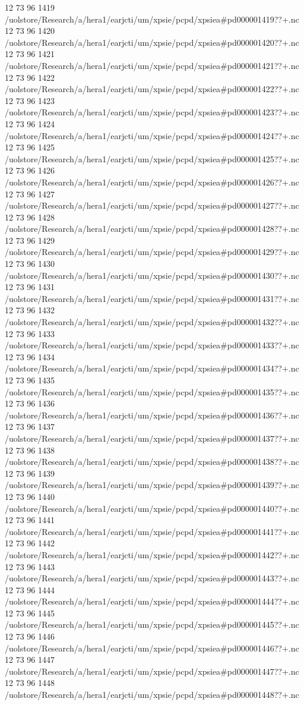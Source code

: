 12 73 96
1419
/uolstore/Research/a/hera1/earjcti/um/xpsie/pcpd/xpsiea#pd000001419??+.nc
12 73 96
1420
/uolstore/Research/a/hera1/earjcti/um/xpsie/pcpd/xpsiea#pd000001420??+.nc
12 73 96
1421
/uolstore/Research/a/hera1/earjcti/um/xpsie/pcpd/xpsiea#pd000001421??+.nc
12 73 96
1422
/uolstore/Research/a/hera1/earjcti/um/xpsie/pcpd/xpsiea#pd000001422??+.nc
12 73 96
1423
/uolstore/Research/a/hera1/earjcti/um/xpsie/pcpd/xpsiea#pd000001423??+.nc
12 73 96
1424
/uolstore/Research/a/hera1/earjcti/um/xpsie/pcpd/xpsiea#pd000001424??+.nc
12 73 96
1425
/uolstore/Research/a/hera1/earjcti/um/xpsie/pcpd/xpsiea#pd000001425??+.nc
12 73 96
1426
/uolstore/Research/a/hera1/earjcti/um/xpsie/pcpd/xpsiea#pd000001426??+.nc
12 73 96
1427
/uolstore/Research/a/hera1/earjcti/um/xpsie/pcpd/xpsiea#pd000001427??+.nc
12 73 96
1428
/uolstore/Research/a/hera1/earjcti/um/xpsie/pcpd/xpsiea#pd000001428??+.nc
12 73 96
1429
/uolstore/Research/a/hera1/earjcti/um/xpsie/pcpd/xpsiea#pd000001429??+.nc
12 73 96
1430
/uolstore/Research/a/hera1/earjcti/um/xpsie/pcpd/xpsiea#pd000001430??+.nc
12 73 96
1431
/uolstore/Research/a/hera1/earjcti/um/xpsie/pcpd/xpsiea#pd000001431??+.nc
12 73 96
1432
/uolstore/Research/a/hera1/earjcti/um/xpsie/pcpd/xpsiea#pd000001432??+.nc
12 73 96
1433
/uolstore/Research/a/hera1/earjcti/um/xpsie/pcpd/xpsiea#pd000001433??+.nc
12 73 96
1434
/uolstore/Research/a/hera1/earjcti/um/xpsie/pcpd/xpsiea#pd000001434??+.nc
12 73 96
1435
/uolstore/Research/a/hera1/earjcti/um/xpsie/pcpd/xpsiea#pd000001435??+.nc
12 73 96
1436
/uolstore/Research/a/hera1/earjcti/um/xpsie/pcpd/xpsiea#pd000001436??+.nc
12 73 96
1437
/uolstore/Research/a/hera1/earjcti/um/xpsie/pcpd/xpsiea#pd000001437??+.nc
12 73 96
1438
/uolstore/Research/a/hera1/earjcti/um/xpsie/pcpd/xpsiea#pd000001438??+.nc
12 73 96
1439
/uolstore/Research/a/hera1/earjcti/um/xpsie/pcpd/xpsiea#pd000001439??+.nc
12 73 96
1440
/uolstore/Research/a/hera1/earjcti/um/xpsie/pcpd/xpsiea#pd000001440??+.nc
12 73 96
1441
/uolstore/Research/a/hera1/earjcti/um/xpsie/pcpd/xpsiea#pd000001441??+.nc
12 73 96
1442
/uolstore/Research/a/hera1/earjcti/um/xpsie/pcpd/xpsiea#pd000001442??+.nc
12 73 96
1443
/uolstore/Research/a/hera1/earjcti/um/xpsie/pcpd/xpsiea#pd000001443??+.nc
12 73 96
1444
/uolstore/Research/a/hera1/earjcti/um/xpsie/pcpd/xpsiea#pd000001444??+.nc
12 73 96
1445
/uolstore/Research/a/hera1/earjcti/um/xpsie/pcpd/xpsiea#pd000001445??+.nc
12 73 96
1446
/uolstore/Research/a/hera1/earjcti/um/xpsie/pcpd/xpsiea#pd000001446??+.nc
12 73 96
1447
/uolstore/Research/a/hera1/earjcti/um/xpsie/pcpd/xpsiea#pd000001447??+.nc
12 73 96
1448
/uolstore/Research/a/hera1/earjcti/um/xpsie/pcpd/xpsiea#pd000001448??+.nc
